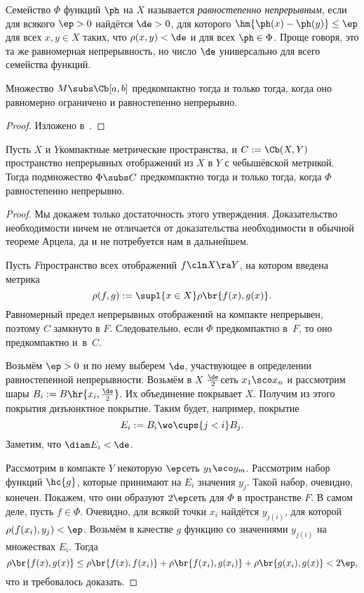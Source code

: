 \documentclass[a4paper]{article}
\begin{document}
\begin{df}
Семейство $\Phi$ функций $\ph$ на $X$ называется \emph{равностепенно непрерывным},
если для всякого $\ep > 0$ найдётся $\de > 0$, для которого
$\hm{\ph(x) - \ph(y)} \le \ep$ для всех $x, y \in X$ таких, что $\rho(x,y) < \de$ и для
всех $\ph \in \Phi$. Проще говоря, это та же равномерная непрерывность,
но число $\de$ универсально для всего семейства функций.
\end{df}

\begin{theorem}
Множество $M \subs \Cb[a,b]$ предкомпактно тогда и только тогда, когда
оно равномерно ограничено и равностепенно непрерывно.
\end{theorem}
\begin{proof}
Изложено в~\cite[гл.~II, \S~7, п.~4]{kf}.
\end{proof}

\begin{theorem}
Пусть $X$ и $Y$\т компактные метрические
пространства, и $C := \Cb(X,Y)$\т пространство непрерывных
отображений из $X$ в $Y$ с чебышёвской метрикой. Тогда подмножество
$\Phi \subs C$ предкомпактно тогда и только тогда,
когда $\Phi$ равностепенно непрерывно.
\end{theorem}
\begin{proof}
Мы докажем только достаточность этого утверждения. Доказательство необходимости
ничем не отличается от доказательства необходимости в обычной теореме Арцела,
да и не потребуется нам в дальнейшем.

Пусть $F$\т пространство всех отображений $f\cln X \ra Y$, на котором введена метрика
$$\rho(f,g) := \supl{x \in X} \rho\br{f(x), g(x)}.$$
Равномерный предел непрерывных отображений на компакте непрерывен, поэтому $C$ замкнуто в $F$.
Следовательно, если $\Phi$ предкомпактно в~$F$, то оно предкомпактно и~в~$C$.

Возьмём $\ep > 0$ и по нему выберем $\de$, участвующее в определении
равностепенной непрерывности. Возьмём в $X$ $\frac{\de}{2}$\д сеть $x_1\sco x_n$
и рассмотрим шары $B_i := B\hr{x_i, \frac{\de}{2}}$. Их объединение покрывает $X$.
Получим из этого покрытия дизъюнктное покрытие. Таким будет, например, покрытие
$$E_i := B_i \wo \cups{j < i} B_j.$$
Заметим, что $\diam E_i < \de$.

Рассмотрим в компакте $Y$ некоторую $\ep$\д сеть $y_1\sco y_m$. Рассмотрим набор функций
$\hc{g}$, которые принимают на $E_i$ значения $y_j$. Такой набор, очевидно, конечен.
Покажем, что они образуют $2\ep$\д сеть для $\Phi$ в пространстве $F$. В самом деле,
пусть $f \in \Phi$. Очевидно, для всякой точки $x_i$ найдётся $y_{j(i)}$, для которой
$\rho(f(x_i), y_j) < \ep$. Возьмём в качестве $g$ функцию со значениями $y_{j(i)}$ на множествах $E_i$.
Тогда
$$\rho\br{f(x),g(x)} \le \rho\br{f(x),f(x_i)} + \rho\br{f(x_i),g(x_i)} + \rho\br{g(x_i),g(x)} < 2\ep,$$
что и требовалось доказать.
\end{proof}
\end{document}
